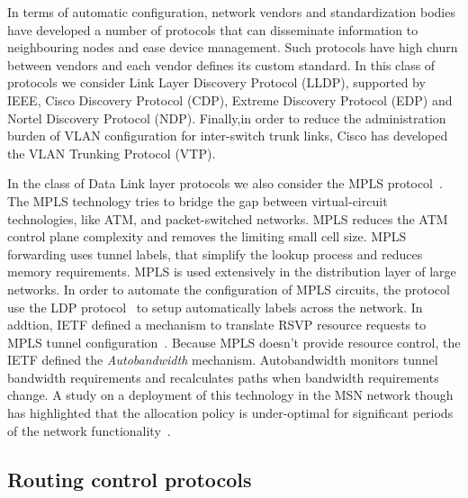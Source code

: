 In terms of automatic configuration, network vendors and standardization bodies
have developed a number of protocols that can disseminate information to
neighbouring nodes and ease device management. Such protocols have high churn
between vendors and each vendor defines its custom standard. In this class of
protocols we consider Link Layer Discovery Protocol (LLDP), supported by IEEE,
Cisco Discovery Protocol (CDP),  Extreme Discovery Protocol (EDP) and Nortel
Discovery Protocol (NDP). Finally,in order to reduce the administration burden
of VLAN configuration for inter-switch trunk links, Cisco has developed the 
VLAN Trunking Protocol (VTP).

In the class of Data Link layer protocols we also consider the MPLS
protocol~\cite{RFC3031}. The MPLS technology tries to bridge the gap between
virtual-circuit technologies, like ATM, and packet-switched networks. MPLS
reduces the ATM control plane complexity and removes the limiting small cell
size. MPLS forwarding uses tunnel labels, that simplify the lookup process and
reduces memory requirements. MPLS is used extensively in the distribution layer
of large networks. In order to automate the configuration of MPLS circuits, the
protocol use the LDP protocol~\cite{RFC5036} to setup automatically labels
across the network. In addtion, IETF defined a mechanism to translate RSVP
resource requests to MPLS tunnel configuration~\cite{RFC3209}.  Because MPLS
doesn't provide resource control, the IETF defined the \emph{Autobandwidth}
mechanism.  Autobandwidth monitors tunnel bandwidth requirements and
recalculates paths when bandwidth requirements change. A study on a deployment
of this technology in the MSN network though has highlighted that the allocation
policy is under-optimal for significant periods of the network functionality~\cite{Pathak2011}.


\subsection{Routing control protocols}

